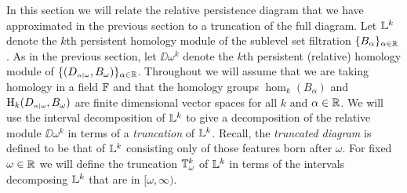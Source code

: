 

In this section we will relate the relative persistence diagram that we have approximated in the previous section to a truncation of the full diagram.
Let $\mathbb{L}^k$ denote the $k$th persistent homology module of the sublevel set filtration $\{B_\alpha\}_{\alpha\in\mathbb{R}}$.
As in the previous section, let $\DD{\omega}^k$ denote the $k$th persistent (relative) homology module of $\{(D_{\scriptscriptstyle \alpha\mid \omega}, B_\omega)\}_{\alpha\in\mathbb{R}}$.
Throughout we will assume that we are taking homology in a field $\mathbb{F}$ and that the homology groups $\hom_k(B_\alpha)$ and $\mathrm{H}_k(D_{\scriptscriptstyle \alpha\mid \omega}, B_\omega)$ are finite dimensional vector spaces for all $k$ and $\alpha\in\mathbb{R}$.
We will use the interval decomposition of $\mathbb{L}^k$ to give a decomposition of the relative module $\DD{\omega}^k$ in terms of a \emph{truncation} of $\mathbb{L}^k$.
Recall, the \emph{truncated diagram} is defined to be that of $\mathbb{L}^k$ consisting only of those features born after $\omega$.
For fixed $\omega\in\mathbb{R}$ we will define the truncation $\mathbb{T}^k_\omega$ of $\mathbb{L}^k$ in terms of the intervals decomposing $\mathbb{L}^k$ that are in $[\omega, \infty)$.

